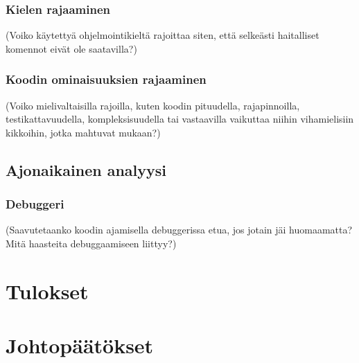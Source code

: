 \subsubsection{Kielen rajaaminen}

(Voiko käytettyä ohjelmointikieltä rajoittaa siten, että selkeästi haitalliset
komennot eivät ole saatavilla?)

\subsubsection{Koodin ominaisuuksien rajaaminen}

(Voiko mielivaltaisilla rajoilla, kuten koodin pituudella, rajapinnoilla,
testikattavuudella, kompleksisuudella tai vastaavilla vaikuttaa niihin
vihamielisiin kikkoihin, jotka mahtuvat mukaan?)

\subsection{Ajonaikainen analyysi}

\subsubsection{Debuggeri}

(Saavutetaanko koodin ajamisella debuggerissa etua, jos jotain jäi huomaamatta?
Mitä haasteita debuggaamiseen liittyy?)


\section{Tulokset}
\label{sec:tulos}


\section{Johtopäätökset}
\label{sec:paketointi}

\pagebreak